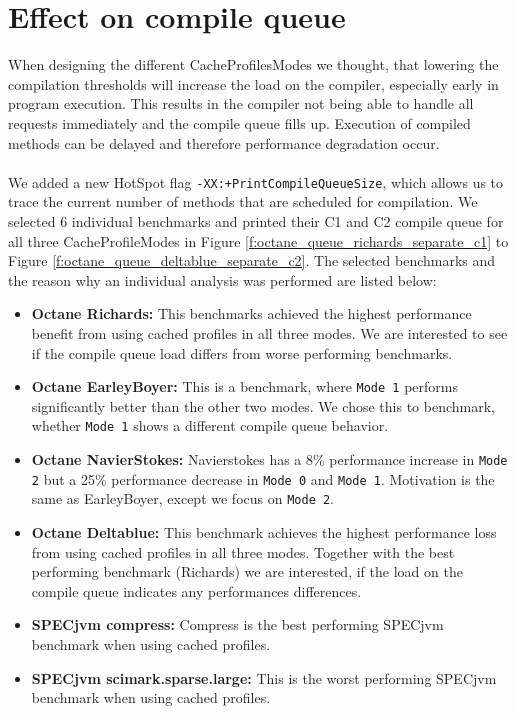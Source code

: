 \section{Effect on compile queue}
\label{s:perf_compilequeue}
When designing the different CacheProfilesModes we thought, that lowering the compilation thresholds will increase the load on the compiler, especially early in program execution. This results in the compiler not being able to handle all requests immediately and the compile queue fills up. Execution of compiled methods can be delayed and therefore performance degradation occur.
\\\\
We added a new HotSpot flag \texttt{-XX:+PrintCompileQueueSize}, which allows us to trace the current number of methods that are scheduled for compilation. We selected 6 individual benchmarks and printed their C1 and C2 compile queue for all three CacheProfileModes in Figure \ref{f:octane_queue_richards_separate_c1} to Figure \ref{f:octane_queue_deltablue_separate_c2}.
The selected benchmarks and the reason why an individual analysis was performed are listed below:
\begin{itemize}
  \item \textbf{Octane Richards:} This benchmarks achieved the highest performance benefit from using cached profiles in all three modes. We are interested to see if the compile queue load differs from worse performing benchmarks.
  \item \textbf{Octane EarleyBoyer:} This is a benchmark, where \texttt{Mode 1} performs significantly better than the other two modes. We chose this to benchmark, whether \texttt{Mode 1} shows a different compile queue behavior.
  \item \textbf{Octane NavierStokes:} Navierstokes has a 8\% performance increase in \texttt{Mode 2} but a 25\% performance decrease in \texttt{Mode 0} and \texttt{Mode 1}. Motivation is the same as EarleyBoyer, except we focus on \texttt{Mode 2}.
  \item \textbf{Octane Deltablue:} This benchmark achieves the highest performance loss from using cached profiles in all three modes. Together with the best performing benchmark (Richards) we are interested, if the load on the compile queue indicates any performances differences.
  \item \textbf{SPECjvm compress:} Compress is the best performing SPECjvm benchmark when using cached profiles. 
  \item \textbf{SPECjvm scimark.sparse.large:} This is the worst performing SPECjvm benchmark when using cached profiles. 
\end{itemize}
